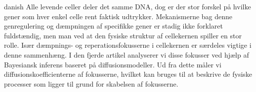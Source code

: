 \begin{otherlanguage*}{danish}
    Alle levende celler deler det samme DNA, dog er der stor forskel på hvilke gener som hver enkel celle rent faktisk udtrykker. Mekanismerne bag denne genregulering og dæmpningen af specifikke gener er stadig ikke forklaret fuldstændig, men man ved at den fysiske struktur af cellekernen spiller en stor rolle. Især dæmpnings- og reperationsfokusserne i cellekernen er særdeles vigtige i denne sammenhæng.  I den fjerde artikel analyserer vi disse fokusser ved hjælp af Bayesiansk inferens baseret på diffusionsmodeller. Ud fra dette måler vi diffusionskoefficienterne af fokusserne, hvilket kan bruges til at beskrive de fysiske processer som ligger til grund for skabelsen af fokusserne.


\end{otherlanguage*}